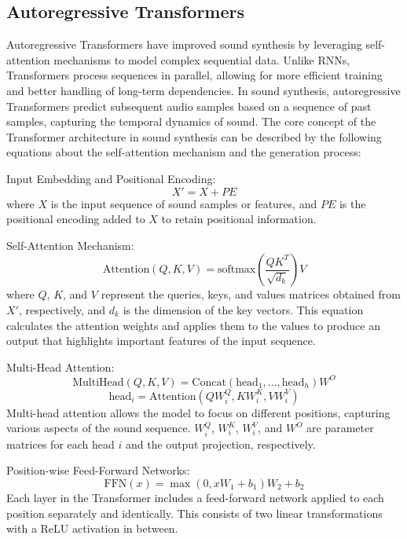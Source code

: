 \documentclass[11pt,a4paper,oneside]{report}
\begin{document}
\subsection{Autoregressive Transformers}

Autoregressive Transformers \cite{yan2021videogpt, wu2022nuwa} have improved sound synthesis by leveraging self-attention mechanisms to model complex sequential data. Unlike RNNs, Transformers process sequences in parallel, allowing for more efficient training and better handling of long-term dependencies. 
In sound synthesis, autoregressive Transformers predict subsequent audio samples based on a sequence of past samples, capturing the temporal dynamics of sound.
The core concept of the Transformer architecture in sound synthesis can be described by the following equations about the self-attention mechanism and the generation process:

Input Embedding and Positional Encoding:
\begin{equation}
X' = X + PE
\end{equation}
where $X$ is the input sequence of sound samples or features, and $PE$ is the positional encoding added to $X$ to retain positional information.

Self-Attention Mechanism:
\begin{equation}
\text{Attention}(Q, K, V) = \text{softmax}\left(\frac{QK^T}{\sqrt{d_k}}\right)V
\end{equation}
where $Q$, $K$, and $V$ represent the queries, keys, and values matrices obtained from $X'$, respectively, and $d_k$ is the dimension of the key vectors. This equation calculates the attention weights and applies them to the values to produce an output that highlights important features of the input sequence.

Multi-Head Attention:
\begin{equation}
\text{MultiHead}(Q, K, V) = \text{Concat}(\text{head}_1, \ldots, \text{head}_h)W^O
\end{equation}
\begin{equation}
\text{head}_i = \text{Attention}(QW^Q_i, KW^K_i, VW^V_i)
\end{equation}
Multi-head attention allows the model to focus on different positions, capturing various aspects of the sound sequence. $W^Q_i$, $W^K_i$, $W^V_i$, and $W^O$ are parameter matrices for each head $i$ and the output projection, respectively.

Position-wise Feed-Forward Networks:
\begin{equation}
\text{FFN}(x) = \max(0, xW_1 + b_1)W_2 + b_2
\end{equation}
Each layer in the Transformer includes a feed-forward network applied to each position separately and identically. This consists of two linear transformations with a ReLU activation in between.
\end{document}
